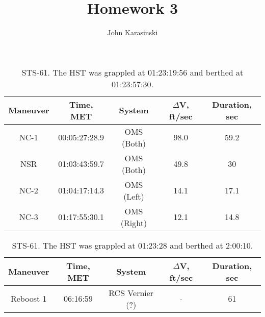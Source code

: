 \documentclass[onecolumn,10pt]{jhwhw}
\author{John Karasinski}
\title{Homework 3}
\begin{document}

\begin{table}[t!]
\begin{center}
\begin{tabular}{|c |c |c |c |c|}
\hline
Maneuver & Time, MET & System & $\Delta$V, ft/sec & Duration, sec \\
\hline
NC-1  & 00:05:27:28.9 & OMS (Both) & 98.0 & 59.2 \\ \hline
NSR   & 01:03:43:59.7 & OMS (Both) & 49.8  & 30 \\ \hline
NC-2  & 01:04:17:14.3 & OMS (Left) & 14.1 & 17.1 \\ \hline
NC-3  & 01:17:55:30.1 & OMS (Right) & 12.1 & 14.8 \\ \hline
\end{tabular}
\end{center}
\caption{STS-61. The HST was grappled at 01:23:19:56 and berthed at 01:23:57:30.}
\end{table}


\begin{table}[t!]
\begin{center}
\begin{tabular}{|c |c |c |c |c|}
\hline
Maneuver & Time, MET & System & $\Delta$V, ft/sec & Duration, sec \\
\hline
Reboost 1  & 06:16:59 & RCS Vernier (?) & - & 61 \\ \hline
\end{tabular}
\end{center}
\caption{STS-61. The HST was grappled at 01:23:28 and berthed at 2:00:10.}
\end{table}
\end{document}
